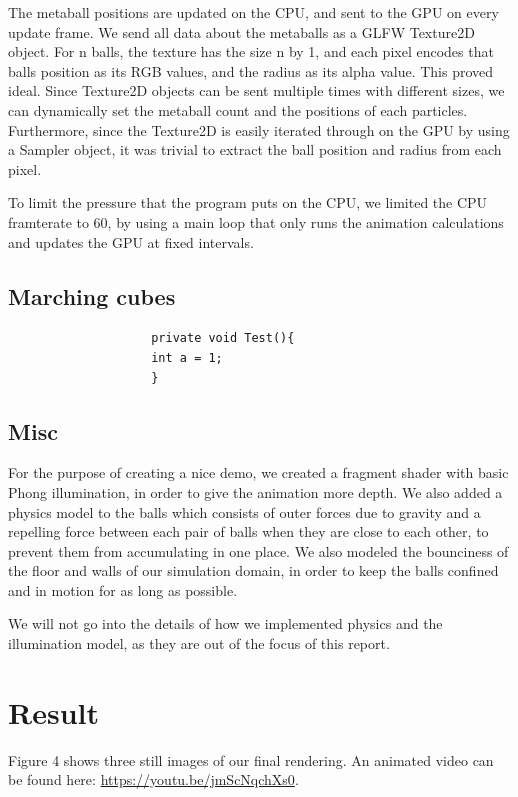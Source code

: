 \documentclass{article}
\begin{document}
\begin{multicols}{2}
        The metaball positions are updated on the CPU, and sent to the GPU on every update frame. We send all data about the metaballs as a GLFW Texture2D object. For n balls, the texture has the size n by 1, and each pixel encodes that balls position as its RGB values, and the radius as its alpha value. This proved ideal. Since Texture2D objects can be sent multiple times with different sizes, we can dynamically set the metaball count and the positions of each particles. Furthermore, since the Texture2D is easily iterated through on the GPU by using a Sampler object, it was trivial to extract the ball position and radius from each pixel.

        To limit the pressure that the program puts on the CPU, we limited the CPU framterate to 60, by using a main loop that only runs the animation calculations and updates the GPU at fixed intervals.


        \subsection{Marching cubes}
        	\begin{minipage}{\linewidth}
			    \begin{lstlisting}
					private void Test(){
					int a = 1;
					}
				\end{lstlisting}
        	\end{minipage}

        \subsection{Misc}
            For the purpose of creating a nice demo, we created a fragment shader with basic Phong illumination, in order to give the animation more depth.
            We also added a physics model to the balls which consists of outer forces due to gravity and a repelling force between each pair of balls when they are close to each other, to prevent them from accumulating in one place.
            We also modeled the bounciness of the floor and walls of our simulation domain, in order to keep the balls confined and in motion for as long as possible.

            We will not go into the details of how we implemented physics and the illumination model, as they are out of the focus of this report.

    \section{Result}
        Figure 4 shows three still images of our final rendering. 
        An animated video can be found here:
        \url{https://youtu.be/jmScNqchXs0}.


\end{multicols}
\end{document}
